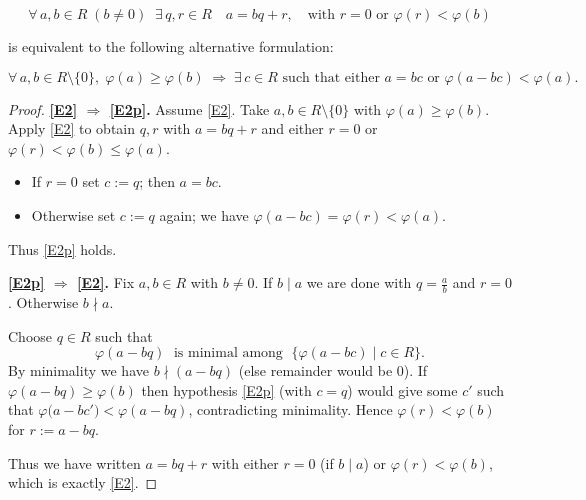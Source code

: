 \documentclass[12pt]{article}
\theoremstyle{definition} %
\theoremstyle{plain} %
\begin{document}
\[
\tag{2}\label{E2}
\forall\,a,b\in R\;(b\neq0)\;\;\exists\,q,r\in R
\quad
a = bq + r,
\quad
\text{with }r=0\text{ or }\varphi(r)<\varphi(b)
\]

is equivalent to the following alternative formulation:

\[
\tag{2'}\label{E2p}
\forall\,a,b\in R\setminus\{0\},\;
\varphi(a)\ge\varphi(b)
\;\Longrightarrow\;
\exists\,c\in R
\text{ such that either } a = bc
\text{ or }\varphi(a-bc)<\varphi(a).
\]

\bigskip
\begin{proof}
\textbf{\eqref{E2} \(\Longrightarrow\) \eqref{E2p}.}\;
Assume \eqref{E2}.  
Take \(a,b\in R\setminus\{0\}\) with \(\varphi(a)\ge\varphi(b)\).
Apply \eqref{E2} to obtain \(q,r\) with \(a=bq+r\) and either \(r=0\) or
\(\varphi(r)<\varphi(b)\le\varphi(a)\).
\begin{itemize}
  \item If \(r=0\) set \(c:=q\); then \(a=bc\).
  \item Otherwise set \(c:=q\) again; we have
        \(
           \varphi(a-bc)
           =\varphi(r)
           <\varphi(a).
        \)
\end{itemize}
Thus \eqref{E2p} holds.

\medskip
\textbf{\eqref{E2p} \(\Longrightarrow\) \eqref{E2}.}\;
Fix \(a,b\in R\) with \(b\neq0\).
If \(b\mid a\) we are done with \(q=\tfrac{a}{b}\) and \(r=0\).
Otherwise \(b\nmid a\).

\smallskip
Choose \(q\in R\) such that 
\[
    \varphi(a-bq) \;\text{ is minimal among }\;
    \{\varphi(a-bc)\mid c\in R\}.
\]
By minimality we have \(b\nmid (a-bq)\) (else remainder would be \(0\)).
If \(\varphi(a-bq)\ge\varphi(b)\) then hypothesis \eqref{E2p}
(with \(c=q\)) would give some \(c'\) such that
\(\varphi\bigl(a-bc'\bigr)<\varphi(a-bq)\),
contradicting minimality.
Hence \(\varphi(r)<\varphi(b)\) for \(r:=a-bq\).

Thus we have written \(a=bq+r\) with either \(r=0\)
(if \(b\mid a\)) or \(\varphi(r)<\varphi(b)\), which is exactly \eqref{E2}.
\end{proof} 
\end{document}

